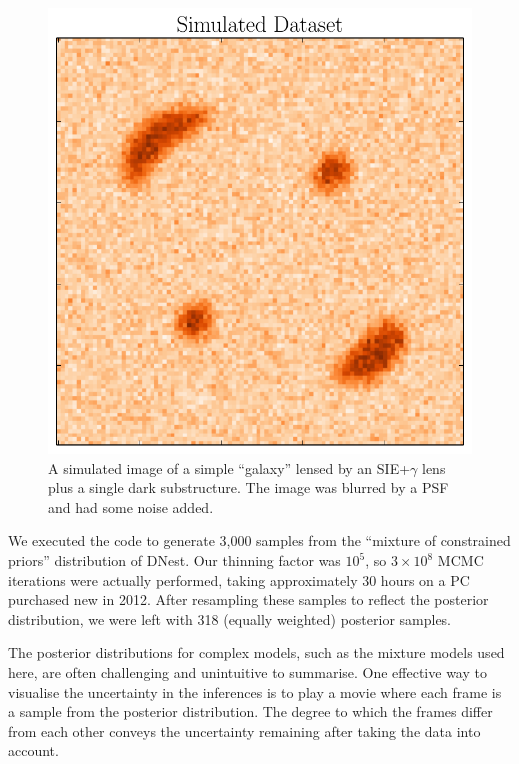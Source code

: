 \documentclass[useAMS,usenatbib]{mn2e}
\begin{document}
\begin{figure}
\begin{center}
\includegraphics[scale=0.5]{simulated_image.pdf}
\caption{A simulated image of a simple ``galaxy'' lensed by an SIE+$\gamma$
lens plus a single dark substructure. The image was blurred by a PSF and had
some noise added.\label{fig:simulated_image}}
\end{center}
\end{figure}

We executed the code to generate 3,000 samples from the ``mixture of
constrained priors'' distribution of DNest. Our thinning factor was $10^5$,
so $3 \times 10^8$ MCMC iterations were actually performed, taking approximately
30 hours on a PC purchased new in 2012. After resampling these samples to
reflect the posterior distribution, we were left with 318
(equally weighted) posterior samples.

The posterior distributions for complex models, such as the mixture models used here, are often challenging and unintuitive to summarise. One effective way
to visualise the uncertainty in the inferences is to play a movie where each
frame is a sample from the posterior distribution. The degree to which the
frames differ from each other conveys the uncertainty remaining after taking
the data into account.
\end{document}

